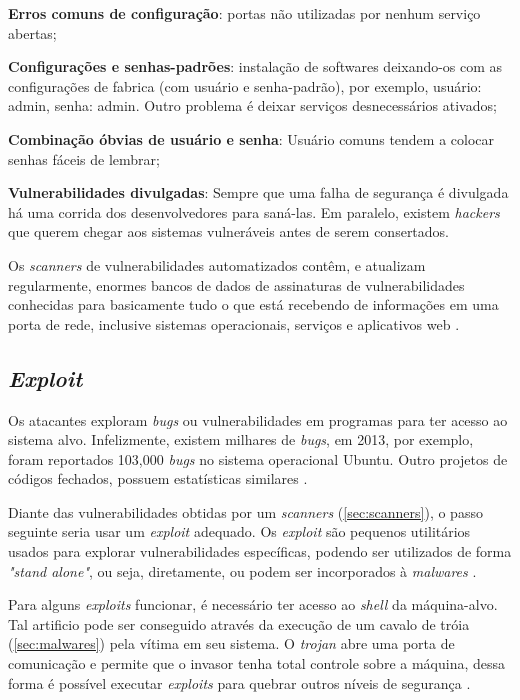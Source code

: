 \begin{alineas}
\item \textbf{Erros comuns de configuração}: portas não utilizadas por nenhum serviço abertas;
\item \textbf{Configurações e senhas-padrões}: instalação de softwares deixando-os com as configurações de fabrica (com usuário e senha-padrão), por exemplo, usuário: admin, senha: admin. Outro problema é deixar serviços desnecessários ativados;
\item \textbf{Combinação óbvias de usuário e senha}: Usuário comuns tendem a colocar senhas fáceis de lembrar;
\item \textbf{Vulnerabilidades divulgadas}: Sempre que uma falha de segurança é divulgada há uma corrida dos desenvolvedores para saná-las. Em paralelo, existem \textit{hackers} que querem chegar aos sistemas vulneráveis antes de serem consertados.
\end{alineas}

Os \textit{scanners} de vulnerabilidades automatizados contêm, e atualizam regularmente, enormes bancos de dados de assinaturas de vulnerabilidades conhecidas para basicamente tudo o que está recebendo de informações em uma porta de rede, inclusive sistemas operacionais, serviços e aplicativos web \cite{hackers:stuart-joel}. 

\subsection{\textit{Exploit}} \label{sec:exploit}

Os atacantes exploram \textit{bugs} ou vulnerabilidades em programas para ter acesso ao sistema alvo. Infelizmente, existem milhares de \textit{bugs}, em 2013, por exemplo, foram reportados 103,000 \textit{bugs} no sistema operacional Ubuntu. Outro projetos de códigos fechados, possuem estatísticas similares \cite{aeg:thanassis}.

Diante das vulnerabilidades obtidas por um \textit{scanners} (\autoref{sec:scanners}), o passo seguinte seria usar um \textit{exploit} adequado. Os \textit{exploit} são pequenos utilitários usados para explorar vulnerabilidades específicas, podendo ser utilizados de forma \textit{"stand alone"}, ou seja, diretamente, ou podem ser incorporados à \textit{malwares} \cite{exploit:cassio}.

Para alguns \textit{exploits} funcionar, é necessário ter acesso ao \textit{shell} da máquina-alvo. Tal artificio pode ser conseguido através da execução de um cavalo de tróia (\autoref{sec:malwares}) pela vítima em seu sistema. O \textit{trojan} abre uma porta de comunicação e permite que o invasor tenha total controle sobre a máquina, dessa forma é possível executar \textit{exploits} para quebrar outros níveis de segurança \cite{univhacker}.

